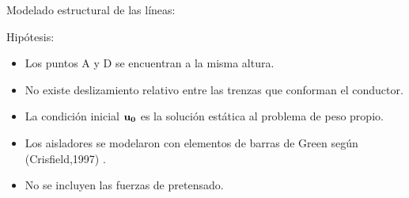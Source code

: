 \documentclass[
  aspectratio=169,
]{beamer}
\begin{document}
\begin{small}
\begin{frame}{Modelado estructural de las líneas:}
		\begin{minipage}[t]{0.35\linewidth}
		\begin{figure}[htbp]
			\centering
			\def\svgwidth{50mm}
			
		\end{figure}
		\end{minipage}\hfill
		\begin{minipage}[t]{0.64\linewidth}
			\begin{block}{Hipótesis:}
				\begin{itemize}
				\item Los puntos A y D se encuentran a la misma altura.
				\pause
				\item No existe deslizamiento relativo entre las trenzas que conforman el conductor.
				\pause
				\item La condición inicial $\bf{u_0}$ es la solución estática al problema de peso propio.
				\pause
				\item Los aisladores se modelaron con elementos de barras de Green según {\color{blue} (Crisfield,1997) }.
				\pause
				\item No se incluyen las fuerzas de pretensado.
				\end{itemize}
			\end{block}
		\end{minipage}
\end{frame}

\end{small}
\end{document}
